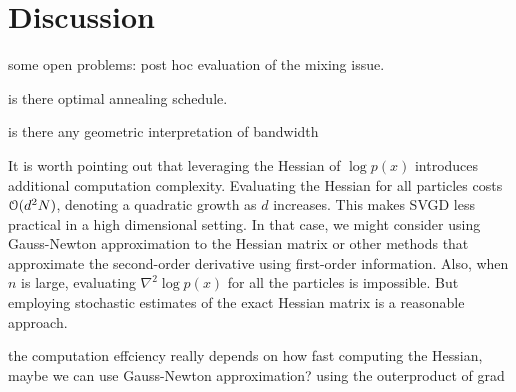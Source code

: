 \section{Discussion} \label{sec:discuss}
some open problems: post hoc evaluation of the mixing issue. 

is there optimal annealing schedule.

is there any geometric interpretation of bandwidth


It is worth pointing out that leveraging the Hessian of $\log p(x)$ introduces additional computation complexity. Evaluating the Hessian for all particles costs $\mathcal{O}(d^2N)$, denoting a quadratic growth as $d$ increases. This makes SVGD less practical in a high dimensional setting. In that case, we might consider using Gauss-Newton approximation to the Hessian matrix or other methods that approximate the second-order derivative using first-order information.
Also, when $n$ is large, evaluating $\nabla^2 \log p(x)$ for all the particles is impossible. But employing  stochastic estimates of the exact Hessian matrix is a reasonable approach.  



the computation effciency really depends on how fast computing the Hessian, maybe we can use Gauss-Newton approximation? using the outerproduct of grad